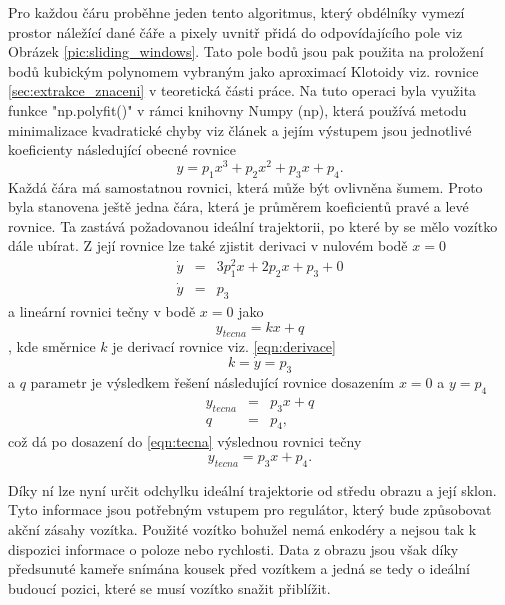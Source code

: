 \documentclass[czech, bc, kky, he, iso690numb]{fasthesis}
\begin{document}
            	Pro každou čáru proběhne jeden tento algoritmus, který obdélníky vymezí prostor náležící dané čáře a pixely uvnitř přidá do odpovídajícího pole viz Obrázek \ref{pic:sliding_windows}. Tato pole bodů jsou pak použita na proložení bodů kubickým polynomem vybraným jako aproximací Klotoidy viz. rovnice \ref{sec:extrakce_znaceni} v teoretická části práce. Na tuto operaci byla využita funkce \command"np.polyfit()" v rámci knihovny Numpy (np), která používá metodu minimalizace kvadratické chyby viz článek \cite{polyfit} a jejím výstupem jsou jednotlivé koeficienty následující obecné rovnice
            		\begin{equation}
            			y = p_{1}x^{3} + p_{2}x^{2} + p_{3}x + p_{4}.
            		\end{equation}
            	Každá čára má samostatnou rovnici, která může být ovlivněna šumem. Proto byla stanovena ještě jedna čára, která je průměrem koeficientů pravé a levé rovnice. Ta zastává požadovanou ideální trajektorii, po které by se mělo vozítko dále ubírat. Z její rovnice lze také zjistit derivaci v nulovém bodě \(x=0\)
            		\begin{eqnarray}
            			\dot{y} &=& 3p_{1}^{2}x + 2p_{2}x + p_{3} + 0\\
            			\dot{y} &=& p_{3} \label{eqn:derivace}
            		\end{eqnarray}
            	a lineární rovnici tečny v bodě \(x=0\) jako
            		\begin{equation}
            			y_{tecna} = kx + q \label{eqn:tecna}	
            		\end{equation},
            	kde  směrnice \(k\) je derivací rovnice viz. \ref{eqn:derivace}
            		\begin{equation}
            			k = \dot{y} = p_{3}
            		\end{equation}
            	a \(q\) parametr je výsledkem řešení následující rovnice dosazením \(x=0\) a \(y=p_{4}\)
            		\begin{eqnarray}
            			y_{tecna} &=& p_{3}x + q\\
            			q &=& p_{4},
            		\end{eqnarray}
            	což dá po dosazení do \ref{eqn:tecna} výslednou rovnici tečny
            		\begin{equation}
            			y_{tecna} = p_{3}x + p_{4}.
            		\end{equation}
            	
            	Díky ní lze nyní určit odchylku ideální trajektorie od středu obrazu a její sklon. Tyto informace jsou potřebným vstupem pro regulátor, který bude způsobovat akční zásahy vozítka. Použité vozítko bohužel nemá enkodéry a nejsou tak k dispozici informace o poloze nebo rychlosti. Data z obrazu jsou však díky předsunuté kameře snímána kousek před vozítkem a jedná se tedy o ideální budoucí pozici, které se musí vozítko snažit přiblížit.
            	
\end{document}
